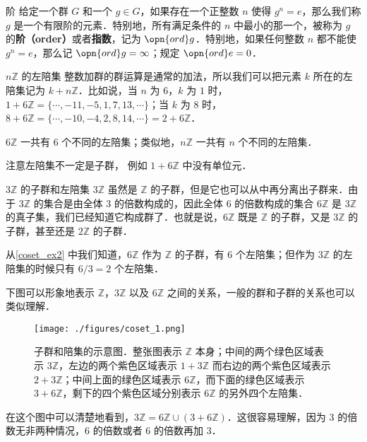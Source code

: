 \begin{definition}{阶}
给定一个群 $G$ 和一个 $g\in G$，如果存在一个正整数 $n$ 使得 $g^n=e$，那么我们称 $g$ 是一个有限阶的元素．特别地，所有满足条件的 $n$ 中最小的那一个，被称为 $g$ 的\textbf{阶（order）}或者\textbf{指数}，记为 $\opn{ord}g$．特别地，如果任何整数 $n$ 都不能使 $g^n=e$，那么记 $\opn{ord}g=\infty$；规定 $\opn{ord}e=0$．
\end{definition}

\begin{example}{$n\mathbb{Z}$ 的左陪集}\label{coset_ex2}
整数加群的群运算是通常的加法，所以我们可以把元素 $k$ 所在的左陪集记为 $k+n\mathbb{Z}$．比如说，当 $n$ 为 $6$，$k$ 为 $1$ 时，$1+6\mathbb{Z}=\{\cdots, -11, -5, 1, 7, 13, \cdots\}$；当 $k$ 为 $8$ 时，$8+6\mathbb{Z}=\{\cdots, -10, -4, 2, 8, 14, \cdots\}=2+6\mathbb{Z}$．

$6\mathbb{Z}$ 一共有 $6$ 个不同的左陪集；类似地，$n\mathbb{Z}$ 一共有 $n$ 个不同的左陪集．
\end{example}
注意左陪集不一定是子群， 例如 $1 + 6\mathbb Z$ 中没有单位元．

\begin{example}{$3\mathbb{Z}$ 的子群和左陪集}\label{coset_ex3}
$3\mathbb{Z}$ 虽然是 $\mathbb{Z}$ 的子群，但是它也可以从中再分离出子群来．由于 $3\mathbb{Z}$ 的集合是由全体 $3$ 的倍数构成的，因此全体 $6$ 的倍数构成的集合 $6\mathbb{Z}$ 是 $3\mathbb{Z}$ 的真子集，我们已经知道它构成群了．也就是说，$6\mathbb{Z}$ 既是 $\mathbb{Z}$ 的子群，又是 $3\mathbb{Z}$ 的子群，甚至还是 $2\mathbb{Z}$ 的子群．

从\autoref{coset_ex2} 中我们知道，$6\mathbb{Z}$ 作为 $\mathbb{Z}$ 的子群，有 $6$ 个左陪集；但作为 $3\mathbb{Z}$ 的左陪集的时候只有 $6/3=2$ 个左陪集．

下图可以形象地表示 $\mathbb{Z}$，$3\mathbb{Z}$ 以及 $6\mathbb{Z}$ 之间的关系，一般的群和子群的关系也可以类似理解．

\begin{figure}[ht]
\centering
\texttt{[image: ./figures/coset\_1.png]}
\caption{子群和陪集的示意图．整张图表示 $\mathbb{Z}$ 本身；中间的两个绿色区域表示 $3\mathbb{Z}$，左边的两个紫色区域表示 $1+3\mathbb{Z}$ 而右边的两个紫色区域表示 $2+3\mathbb{Z}$；中间上面的绿色区域表示 $6\mathbb{Z}$，而下面的绿色区域表示 $3+6\mathbb{Z}$，剩下的四个紫色区域分别表示 $6\mathbb{Z}$ 的另外四个左陪集．} \label{coset_fig1}
\end{figure}

在这个图中可以清楚地看到，$3\mathbb{Z}=6\mathbb{Z}\cup(3+6\mathbb{Z})$．这很容易理解，因为 $3$ 的倍数无非两种情况，$6$ 的倍数或者 $6$ 的倍数再加 $3$．

\end{example}

